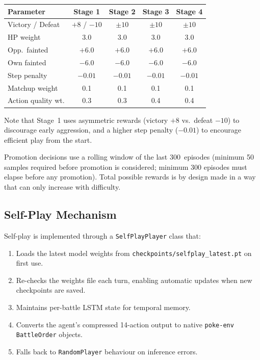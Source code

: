 \begin{center}
\small
\begin{tabularx}{\textwidth}{l c c c c}
  \toprule
  \textbf{Parameter} & \textbf{Stage 1} & \textbf{Stage 2} & \textbf{Stage 3} & \textbf{Stage 4} \\
  \midrule
  Victory / Defeat   & $+8$ / $-10$ & $\pm 10$ & $\pm 10$ & $\pm 10$ \\
  HP weight          & 3.0   & 3.0   & 3.0   & 3.0   \\
  Opp.\ fainted      & $+6.0$ & $+6.0$ & $+6.0$ & $+6.0$ \\
  Own fainted        & $-6.0$ & $-6.0$ & $-6.0$ & $-6.0$ \\
  Step penalty       & $-0.01$ & $-0.01$ & $-0.01$ & $-0.01$ \\
  Matchup weight     & 0.1   & 0.1   & 0.1   & 0.1   \\
  Action quality wt. & 0.3   & 0.3   & 0.4   & 0.4   \\
  \bottomrule
\end{tabularx}
\end{center}

Note that Stage~1 uses asymmetric rewards (victory $+8$ vs.\ defeat $-10$) to
discourage early aggression, and a higher step penalty ($-0.01$) to encourage
efficient play from the start.

Promotion decisions use a rolling window of the last 300~episodes (minimum 50
samples required before promotion is considered; minimum 300 episodes must
elapse before any promotion). Total possible rewards is by design made in a way that can only increase with difficulty.

\subsection{Self-Play Mechanism}
\label{sec:self_play}

Self-play is implemented through a \texttt{SelfPlayPlayer} class that:

\begin{enumerate}
  \item Loads the latest model weights from
        \texttt{checkpoints/selfplay\_latest.pt} on first use.
  \item Re-checks the weights file each turn, enabling automatic updates
        when new checkpoints are saved.
  \item Maintains per-battle LSTM state for temporal memory.
  \item Converts the agent's compressed 14-action output to native
        \texttt{poke-env} \texttt{BattleOrder} objects.
  \item Falls back to \texttt{RandomPlayer} behaviour on inference errors.
\end{enumerate}

